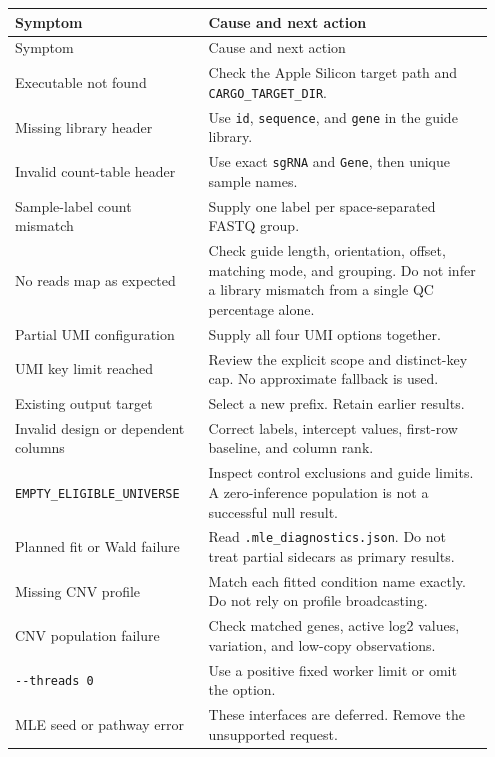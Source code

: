 \documentclass[11pt,a4paper]{article}
\begin{document}
\begingroup\small\setlength{\tabcolsep}{5pt}
\begin{longtable}{@{}>{\raggedright\arraybackslash}p{0.38\linewidth}>{\raggedright\arraybackslash}p{0.57\linewidth}@{}}
\toprule
Symptom & Cause and next action \\
\midrule\endfirsthead
\toprule
Symptom & Cause and next action \\
\midrule\endhead
\bottomrule\endfoot
Executable not found & Check the Apple Silicon target path and \texttt{\small CARGO\_\allowbreak{}TARGET\_\allowbreak{}DIR}. \\
Missing library header & Use \texttt{\small id}, \texttt{\small sequence}, and \texttt{\small gene} in the guide library. \\
Invalid count-table header & Use exact \texttt{\small sgRNA} and \texttt{\small Gene}, then unique sample names. \\
Sample-label count mismatch & Supply one label per space-separated FASTQ group. \\
No reads map as expected & Check guide length, orientation, offset, matching mode, and grouping. Do not infer a library mismatch from a single QC percentage alone. \\
Partial UMI configuration & Supply all four UMI options together. \\
UMI key limit reached & Review the explicit scope and distinct-key cap. No approximate fallback is used. \\
Existing output target & Select a new prefix. Retain earlier results. \\
Invalid design or dependent columns & Correct labels, intercept values, first-row baseline, and column rank. \\
\texttt{\small EMPTY\_\allowbreak{}ELIGIBLE\_\allowbreak{}UNIVERSE} & Inspect control exclusions and guide limits. A zero-inference population is not a successful null result. \\
Planned fit or Wald failure & Read \texttt{\small .\allowbreak{}mle\_\allowbreak{}diagnostics.\allowbreak{}json}. Do not treat partial sidecars as primary results. \\
Missing CNV profile & Match each fitted condition name exactly. Do not rely on profile broadcasting. \\
CNV population failure & Check matched genes, active log2 values, variation, and low-copy observations. \\
\texttt{\small -\allowbreak{}-\allowbreak{}threads 0} & Use a positive fixed worker limit or omit the option. \\
MLE seed or pathway error & These interfaces are deferred. Remove the unsupported request. \\
\end{longtable}\endgroup
\end{document}
